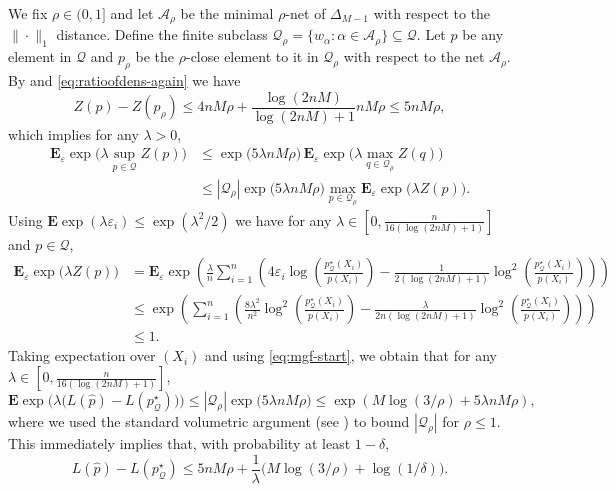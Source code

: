 \documentclass[11pt]{article}
\newcommand{\E}{{\mathbf E}}
\renewcommand{\le}{\leqslant}
\newcommand{\M}{M}
\newcommand{\Qs}{\mathcal{Q}}
\theoremstyle{definition}
\theoremstyle{remark}
\begin{document}
We fix $\rho\in(0,1]$ and let $\mathcal A_\rho$ be the minimal $\rho$-net of $\Delta_{\M-1}$ with respect to the $\|\cdot\|_1$ distance.
Define the finite subclass $\mathcal Q_\rho= \{w_\alpha:\alpha\in\mathcal A_\rho\}\subseteq \mathcal Q$. Let $p$ be any element in $\Qs$ and $p_{\rho}$ be the $\rho$-close element to it in $\mathcal{Q}_{\rho}$ with respect to the net $\mathcal{A}_\rho$.
By  and \eqref{eq:ratioofdens-again} we have
\[
Z(p) - Z(p_\rho) \le 4nM\rho + \frac{\log(2nM)}{\log(2nM)+1}nM\rho \le 5nM\rho,
\]
which implies for any $\lambda > 0$,
\begin{align*}
\E_{\varepsilon}\exp\Big(\lambda\sup_{p\in\Qs} Z(p)\Big)
&\le
\exp\Big(5\lambda nM\rho\Big)\,
\E_{\varepsilon}\exp\Big(\lambda\max_{q\in\Qs_\rho} Z(q)\Big)
\\
&\le
|\Qs_\rho|\exp\Big(5\lambda nM\rho\Big)\max\limits_{p \in \mathcal{Q}_{\rho}}\E_{\varepsilon}\exp\Big(\lambda Z(p)\Big).
\end{align*}
Using $\E\exp(\lambda \varepsilon_i) \le \exp(\lambda^2/2)$ we have for any $\lambda \in \left[0, \frac{n}{16(\log(2nM)+1)}\right]$ and $p \in \mathcal{Q}$,
\begin{align*}
\E_{\varepsilon}\exp\Big(\lambda Z(p)\Big)&=\E_{\varepsilon}\exp\left(\frac{\lambda}{n}\sum\limits_{i =1}^n\left(4\varepsilon_i\log\left(\frac{p^\star_{\Qs}(X_i)}{p(X_i)}\right)
-\frac{1}{2(\log(2nM)+1)}\log^2\left(\frac{p^\star_{\Qs}(X_i)}{p(X_i)}\right)\right)\right) 
\\
&\le \exp\left(\sum\limits_{i =1}^n\left(\frac{8\lambda^2}{n^2}\log^2\left(\frac{p^\star_{\Qs}(X_i)}{p(X_i)}\right)
-\frac{\lambda}{2n(\log(2nM)+1)}\log^2\left(\frac{p^\star_{\Qs}(X_i)}{p(X_i)}\right)\right)\right) 
\\
&\le 1.
\end{align*}
Taking expectation over $(X_i)$ and using \eqref{eq:mgf-start}, we obtain that for any $\lambda \in \left[0, \frac{n}{16(\log(2nM)+1)}\right]$,
\begin{equation}\label{eq:mgf-excess-final}
\E\exp\Big(\lambda\big(L(\widehat p)-L(p^\star_{\Qs})\big)\Big)
\le
|\Qs_\rho|\exp\Big(5\lambda nM\rho\Big) \le \exp\left(M\log(3/\rho) + 5\lambda nM\rho\right),
\end{equation}
where we used the standard volumetric argument (see \cite[Lemma 5.7]{wainwright2019high}) to bound $|\mathcal{Q}_{\rho}|$ for $\rho \le 1$. This immediately implies that, with probability at least $1-\delta$,
\begin{equation}\label{eq:hp-excess-risk-W}
L(\widehat p)-L(p^\star_{\Qs})
\le
5nM\rho + \frac{1}{\lambda}\Big(M\log(3/\rho)+\log(1/\delta)\Big).
\end{equation}
\end{document}
